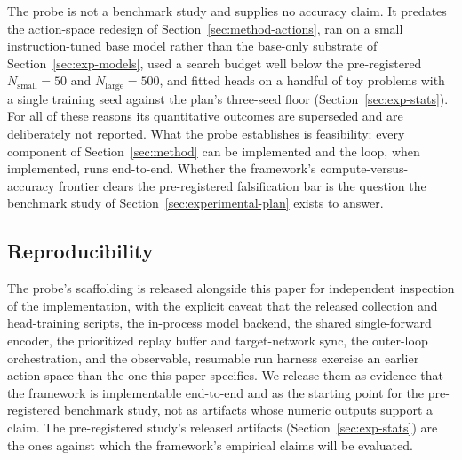 The probe is not a benchmark study and supplies no accuracy claim. It predates
the action-space redesign of Section~\ref{sec:method-actions}, ran on a small
instruction-tuned base model rather than the base-only substrate of
Section~\ref{sec:exp-models}, used a search budget well below the pre-registered
$N_{\mathrm{small}} = 50$ and $N_{\mathrm{large}} = 500$, and fitted heads on a
handful of toy problems with a single training seed against the plan's
three-seed floor (Section~\ref{sec:exp-stats}). For all of these reasons its
quantitative outcomes are superseded and are deliberately not reported. What the
probe establishes is feasibility: every component of Section~\ref{sec:method}
can be implemented and the loop, when implemented, runs end-to-end. Whether the
framework's compute-versus-accuracy frontier clears the pre-registered
falsification bar is the question the benchmark study of
Section~\ref{sec:experimental-plan} exists to answer.

\subsection{Reproducibility}
\label{sec:pilot-reproducibility}

The probe's scaffolding is released alongside this paper for independent
inspection of the implementation, with the explicit caveat that the released
collection and head-training scripts, the in-process model backend, the shared
single-forward encoder, the prioritized replay buffer and target-network sync,
the outer-loop orchestration, and the observable, resumable run harness exercise
an earlier action space than the one this paper specifies. We release them as
evidence that the framework is implementable end-to-end and as the starting
point for the pre-registered benchmark study, not as artifacts whose numeric
outputs support a claim. The pre-registered study's released artifacts
(Section~\ref{sec:exp-stats}) are the ones against which the framework's
empirical claims will be evaluated.
